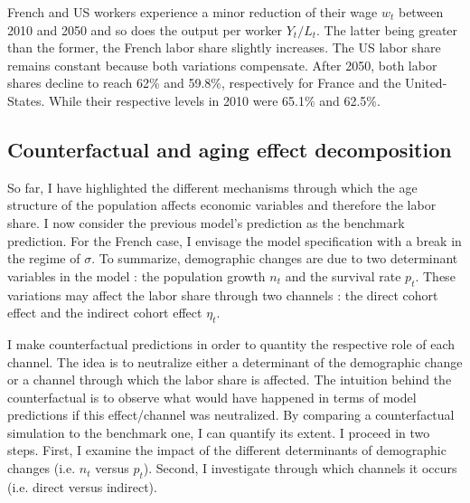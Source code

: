 French and US workers experience a minor reduction of their wage $w_t$ between 2010 and 2050 and so does the output per worker $Y_t/L_t$. The latter being greater than the former, the French labor share slightly increases. The US labor share remains constant because both variations compensate. After 2050, both labor shares decline to reach 62\% and 59.8\%, respectively for France and the United-States. While their respective levels in 2010 were 65.1\% and 62.5\%.

\subsection{Counterfactual and aging effect decomposition} \label{subsec:counterfactual}

So far, I have highlighted the different mechanisms through which the age structure of the population affects economic variables and therefore the labor share. I now consider the previous model's prediction as the benchmark prediction. For the French case, I envisage the model specification with a break in the regime of $\sigma$. To summarize, demographic changes are due to two determinant variables in the model : the population growth $n_t$ and the survival rate $p_t$. These variations may affect the labor share through two channels : the direct cohort effect and the indirect cohort effect $\eta_t$.

I make counterfactual predictions in order to quantity the respective role of each channel. The idea is to neutralize either a determinant of the demographic change or a channel through which the labor share is affected. The intuition behind the counterfactual is to observe what would have happened in terms of model predictions if this effect/channel was neutralized. By comparing a counterfactual simulation to the benchmark one, I can quantify its extent. I proceed in two steps. First, I examine the impact of the different determinants of demographic changes (i.e. $n_t$ versus $p_t$). Second, I investigate through which channels it occurs (i.e. direct versus indirect).

